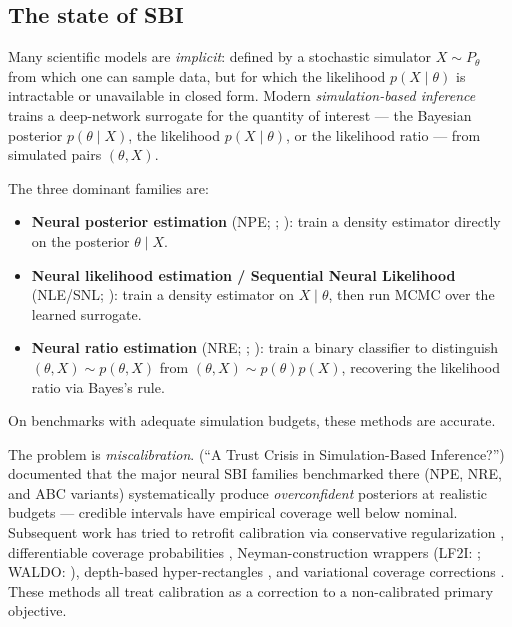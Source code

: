 \documentclass[11pt]{article}
\providecommand{\tightlist}{\setlength{\itemsep}{0pt}\setlength{\parskip}{0pt}}
\begin{document}
\subsection{The state of SBI}\label{subsec:1.1}

Many scientific models are \emph{implicit}: defined by a stochastic
simulator \(X \sim P_\theta\) from which one can sample data, but for
which the likelihood \(p(X \mid \theta)\) is intractable or unavailable
in closed form. Modern \emph{simulation-based inference}
\citep[SBI; for an overview see][]{CranmerEtAl2020} trains a deep-network
surrogate for the quantity of interest --- the Bayesian posterior
\(p(\theta \mid X)\), the likelihood \(p(X \mid \theta)\), or the
likelihood ratio --- from simulated pairs \((\theta, X)\).

The three dominant families are:

\begin{itemize}
\tightlist
\item
  \textbf{Neural posterior estimation} (NPE; \citealp{PapamakariosMurray2016};
  \citealp{GreenbergEtAl2019}): train a density estimator directly on
  the posterior \(\theta \mid X\).
\item
  \textbf{Neural likelihood estimation / Sequential Neural Likelihood}
  (NLE/SNL; \citealp{PapamakariosEtAl2019}): train a density estimator
  on \(X \mid \theta\), then run MCMC over the learned surrogate.
\item
  \textbf{Neural ratio estimation} (NRE; \citealp{HermansEtAl2020};
  \citealp{MillerEtAl2022}): train a binary classifier to distinguish
  \((\theta, X) \sim p(\theta, X)\) from
  \((\theta, X) \sim p(\theta)p(X)\), recovering the likelihood ratio
  via Bayes's rule.
\end{itemize}

On benchmarks with adequate simulation budgets, these methods are
accurate.

The problem is \emph{miscalibration}. \citet{HermansEtAl2022} (``A
Trust Crisis in Simulation-Based Inference?'') documented that the
major neural SBI families benchmarked there (NPE, NRE, and ABC variants)
systematically produce \emph{overconfident} posteriors at realistic
budgets --- credible intervals have empirical coverage well below
nominal. Subsequent work has tried to retrofit
calibration via conservative regularization \citep{DelaunoyEtAl2022},
differentiable coverage probabilities \citep{FalkiewiczEtAl2023},
Neyman-construction wrappers (LF2I: \citealp{DalmassoEtAl2024}; WALDO:
\citealp{MasseranoEtAl2023}), depth-based hyper-rectangles
\citep{BortolatoVentura2025}, and variational coverage corrections
\citep{PatelEtAl2023}. These methods all treat calibration as a
correction to a non-calibrated primary objective.
\end{document}
